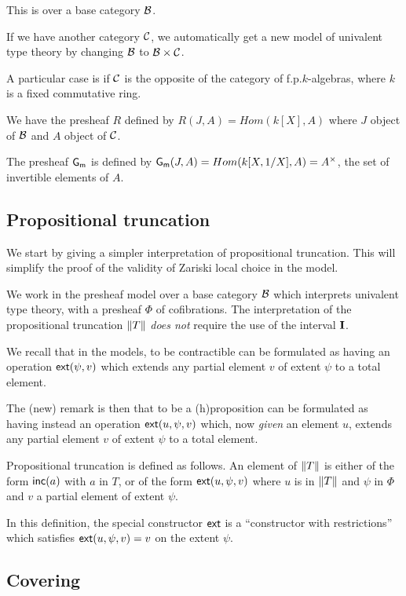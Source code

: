  This is over a base category $\mathcal{B}$.
 
 If we have another category $\mathcal{C}$, we automatically get a new model of univalent type theory by
 changing $\mathcal{B}$ to $\mathcal{B}\times\mathcal{C}$.

 A particular case is if $\mathcal{C}$ is the opposite of the category of f.p.\@ $k$-algebras, where $k$ is a
 fixed commutative ring.

 We have the presheaf $R$ defined by $R(J,A) = Hom(k[X],A)$ where $J$ object of $\mathcal{B}$ and $A$ object of $\mathcal{C}$.

  The presheaf $\mathsf{G_m}$ is defined by $\mathsf{G_m}(J,A) = Hom(k[X,1/X],A) = A^{\times}$, the set of invertible elements of $A$.

\subsection{Propositional truncation}

    We start by giving a simpler interpretation of propositional truncation. This will simplify
    the proof of the validity of Zariski local choice in the model.

    We work in the presheaf model over a base category $\mathcal{B}$ which interprets univalent type theory,
    with a presheaf $\Phi$ of cofibrations. The interpretation of the propositional
    truncation $\left\lVert T \right\rVert$ {\em does not} require the use of the interval $\mathbf{I}$.

    We recall that in the models, to be contractible can be formulated as having an operation
    $\mathsf{ext}(\psi,v)$ which extends any partial element $v$ of extent $\psi$ to a total element.

    The (new) remark is then that to be a (h)proposition can be formulated as having instead
    an operation $\mathsf{ext}(u,\psi,v)$ which, now {\em given}
    an element $u$, extends any partial element $v$ of extent $\psi$ to a total element.

\medskip    

Propositional truncation is defined as follows. An element of $\left\lVert T \right\rVert$ is either of the form
$\mathsf{inc}(a)$ with $a$ in $T$, or of the form $\mathsf{ext}(u,\psi,v)$ where $u$ is in $\left\lVert T \right\rVert$ and $\psi$
in $\Phi$ and $v$ a partial element of extent $\psi$.

In this definition, the special constructor $\mathsf{ext}$ is a ``constructor with restrictions'' which
satisfies $\mathsf{ext}(u,\psi,v) = v$ on the extent $\psi$.

\subsection{Covering}

